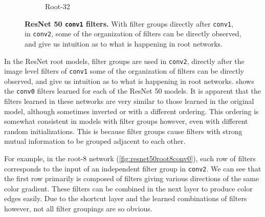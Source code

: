 \documentclass[thesis]{subfiles}
\begin{document}
\begin{figure}[tb]
\begin{subfigure}[b]{0.45\linewidth}
			\caption{Root-32}
			\label{fig:resnet50root32conv0}
		\end{subfigure}
		\caption{\textbf{ResNet 50 \texttt{conv1} filters.} With filter groups directly after \texttt{conv1}, in \texttt{conv2}, some of the organization of filters can be directly observed, and give us intuition as to what is happening in root networks.}
		\label{fig:resnet50conv0}
	\end{figure}
	In the ResNet root models, filter groups are used in \texttt{conv2},  directly after the image level filters of \texttt{conv1} some of the organization of filters can be directly observed, and give us intuition as to what is happening in root networks.  shows the \texttt{conv0} filters learned for each of the ResNet 50 models. It is apparent that the filters learned in these networks are very similar to those learned in the original model, although sometimes inverted or with a different ordering. This ordering is somewhat consistent in models with filter groups however, even with different random initializations. This is because filter groups cause filters with strong mutual information to be grouped adjacent to each other.
	
	For example, in the root-8 network (\cref{fig:resnet50root8conv0}), each row of filters corresponds to the input of an independent filter group in \texttt{conv2}. We can see that the first row primarily is composed of filters giving various directions of the same color gradient. These filters can be combined in the next layer to produce color edges easily. Due to the shortcut layer and the learned combinations of filters however, not all filter groupings are so obvious.
	
\end{document}
